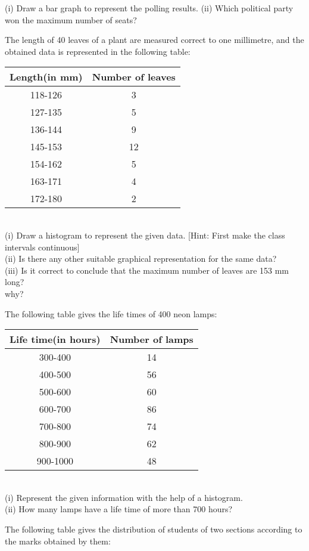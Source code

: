 (i) Draw a bar graph to represent the polling results.
(ii) Which political party won the maximum number of seats?\\
 \item The length of 40 leaves of a plant are measured correct to one millimetre, and the obtained data is represented in the following table:\\
\begin{tabular}{|c|c|}
\hline
\textbf{Length(in mm)} &\textbf{Number of leaves} \\
\hline
118-126 &3\\
127-135 &5\\
136-144 &9\\
145-153 &12\\
154-162 &5\\
163-171 &4\\
172-180 &2\\
\hline
\end{tabular}\\
 
(i) Draw a histogram to represent the given data. [Hint: First make the class intervals continuous]\\
(ii) Is there any other suitable graphical representation for the same data?\\
(iii) Is it correct to conclude that the maximum number of leaves are 153 mm long?\\
why?\\
\item The following table gives the life times of 400 neon lamps:\\

\begin{tabular}{|c|c|}
\hline
\textbf{Life time(in hours)} &\textbf{Number of lamps} \\
\hline
300-400 &14\\
400-500 &56\\
500-600 &60\\
600-700 &86\\
700-800 &74\\
800-900 &62\\
900-1000 &48\\
\hline
\end{tabular}\\
 

(i) Represent the given information with the help of a histogram.\\
(ii) How many lamps have a life time of more than 700 hours?\\
\item The following table gives the distribution of students of two sections according to
the marks obtained by them:\\

